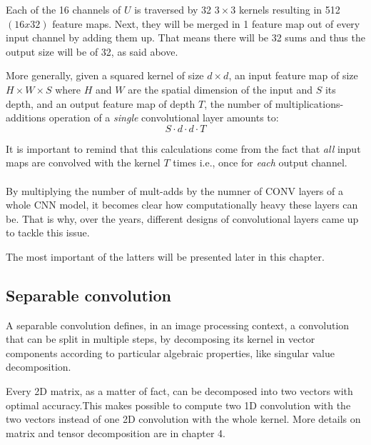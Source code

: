  Each of the 16 channels of $U$ is traversed by 32 $3\times3$ kernels resulting in 512 $(16x32)$ feature maps. Next, they will be merged in 1 feature map out of every input channel by adding them up. That means there will be 32 sums and thus the output size will be of 32, as said above. 
 \newline 
 
 More generally, given a squared kernel of size $d \times d$, an input feature map of size $H \times W \times S$ where $H$ and $W$ are the spatial dimension of the input and $S$ its depth, and an output feature map of depth $T$, the number of multiplications-additions operation of a \emph{single} convolutional layer amounts to: 
 \begin{equation}
    S\cdot d \cdot d \cdot T 
 \end{equation}
 
 It is important to remind that this calculations come from the fact that \emph{all} input maps are convolved with the kernel $T$ times i.e., once for \emph{each} output channel. \\
 \\
 
 By multiplying the number of mult-adds by the numner of CONV layers of a whole CNN model, it becomes clear how computationally heavy these layers can be. That is why, over the years, different designs of convolutional layers came up to tackle this issue. 
 \newline 
 
The most important of the latters will be presented later in this chapter.  



\subsection{Separable convolution}
\label{subsec:severino}
A separable convolution defines, in an image processing context, a convolution that can be split in multiple steps, by decomposing its kernel in vector components according to particular algebraic properties, like singular value decomposition. 

Every 2D matrix, as a matter of fact, can be decomposed into two vectors with optimal accuracy.This makes possible to compute two 1D convolution with the two vectors instead of one 2D convolution with the whole kernel. More details on matrix and tensor decomposition are in chapter 4. 

